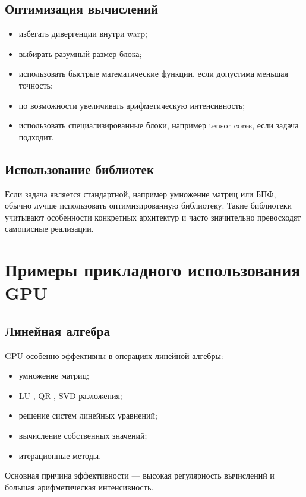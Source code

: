 \documentclass[12pt,a4paper]{article}
\begin{document}
\subsection{Оптимизация вычислений}

\begin{itemize}
    \item избегать дивергенции внутри warp;
    \item выбирать разумный размер блока;
    \item использовать быстрые математические функции, если допустима меньшая точность;
    \item по возможности увеличивать арифметическую интенсивность;
    \item использовать специализированные блоки, например tensor cores, если задача подходит.
\end{itemize}

\subsection{Использование библиотек}

Если задача является стандартной, например умножение матриц или БПФ, обычно лучше использовать оптимизированную библиотеку. Такие библиотеки учитывают особенности конкретных архитектур и часто значительно превосходят самописные реализации.

\section{Примеры прикладного использования GPU}

\subsection{Линейная алгебра}

GPU особенно эффективны в операциях линейной алгебры:

\begin{itemize}
    \item умножение матриц;
    \item LU-, QR-, SVD-разложения;
    \item решение систем линейных уравнений;
    \item вычисление собственных значений;
    \item итерационные методы.
\end{itemize}

Основная причина эффективности --- высокая регулярность вычислений и большая арифметическая интенсивность.
\end{document}
